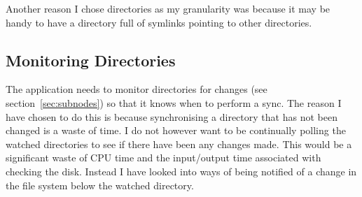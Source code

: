 \documentclass[12pt]{article}
\begin{document}
Another reason I chose directories as my granularity was because it may be
handy to have a directory full of symlinks pointing to other directories.

\subsection{Monitoring Directories}
The application needs to monitor directories for changes
(see section~\ref{sec:subnodes})
so that it knows when to perform a sync. The reason I have
chosen to do this is because synchronising a directory that
has not been changed is a waste of time. I do not
however want to be continually polling the watched
directories to see if there have been any changes made.
This would be a significant waste of CPU time and the input/output
time associated with checking the disk. Instead
I have looked into ways of being notified of a
change in the file system below the watched directory.
\end{document}
